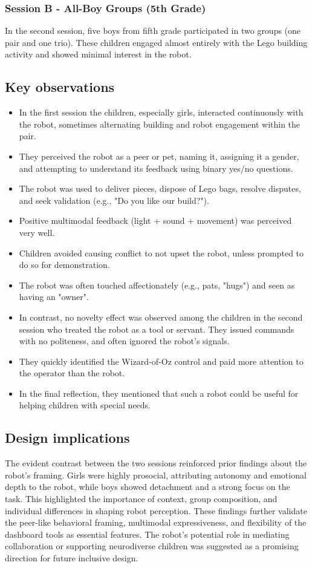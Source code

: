 \documentclass[a4paper]{usiinfbachelorproject}
\begin{document}
\subsubsection*{\textbf{Session B - All-Boy Groups (5th Grade)}}
In the second session, five boys from fifth grade participated in two groups (one pair and one trio).
These children engaged almost entirely with the Lego building activity and showed minimal interest in the robot.

\subsection*{\textbf{Key observations}}
\begin{itemize}
    \item In the first session the children, especially girls, interacted continuously with the robot, sometimes alternating building and robot engagement within the pair.
    \item They perceived the robot as a peer or pet, naming it, assigning it a gender, and attempting to understand its feedback using binary yes/no questions.
    \item The robot was used to deliver pieces, dispose of Lego bags, resolve disputes, and seek validation (e.g., "Do you like our build?").
    \item Positive multimodal feedback (light + sound + movement) was perceived very well.
    \item Children avoided causing conflict to not upset the robot, unless prompted to do so for demonstration.
    \item The robot was often touched affectionately (e.g., pats, "hugs") and seen as having an "owner".
    \item In contrast, no novelty effect was observed among the children in the second session who treated the robot as a tool or servant.
          They issued commands with no politeness, and often ignored the robot's signals.
    \item They quickly identified the Wizard-of-Oz control and paid more attention to the operator than the robot.
    \item In the final reflection, they mentioned that such a robot could be useful for helping children with special needs.
\end{itemize}

\subsection*{\textbf{Design implications}}
The evident contrast between the two sessions reinforced prior findings about the robot's framing.
Girls were highly prosocial, attributing autonomy and emotional depth to the robot, while boys showed detachment and a strong focus on the task.
This highlighted the importance of context, group composition, and individual differences in shaping robot perception.
These findings further validate the peer-like behavioral framing, multimodal expressiveness, and flexibility of the dashboard tools as essential features.
The robot's potential role in mediating collaboration or supporting neurodiverse children was suggested as a promising direction for future inclusive design.
\end{document}

